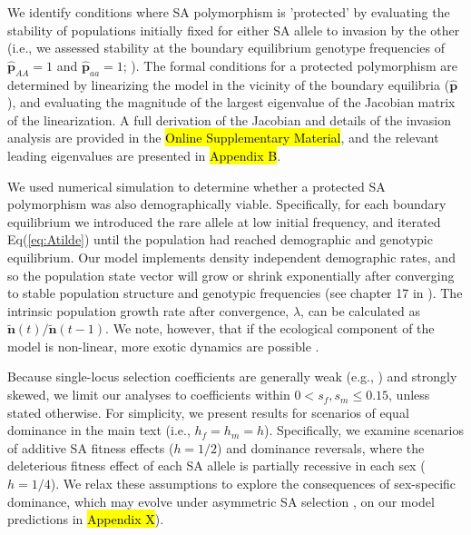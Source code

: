 \documentclass[11pt]{article}
\def\mbf#1{\mathbf{#1}}
\begin{document}
We identify conditions where SA polymorphism is 'protected' by evaluating the stability of populations initially fixed for either SA allele to invasion by the other (i.e., we assessed stability at the boundary equilibrium genotype frequencies of $\hat{\mbf{p}}_{AA} = 1$ and $\hat{\mbf{p}}_{aa} = 1$; \citealt{Levene1953, Prout1968, deVriesCaswell2019b}). The formal conditions for a protected polymorphism are determined by linearizing the model in the vicinity of the boundary equilibria ($\hat{\mbf{p}}$), and evaluating the magnitude of the largest eigenvalue of the Jacobian matrix of the linearization. A full derivation of the Jacobian and details of the invasion analysis are provided in the \hl{Online Supplementary Material}, and the relevant leading eigenvalues are presented in \hl{Appendix B}.


We used numerical simulation to determine whether a protected SA polymorphism was also demographically viable. Specifically, for each boundary equilibrium we introduced the rare allele at low initial frequency, and iterated Eq(\ref{eq:Atilde}) until the population had reached demographic and genotypic equilibrium. Our model implements density independent demographic rates, and so the population state vector will grow or shrink exponentially after converging to stable population structure and genotypic frequencies (see chapter 17 in \citealt{Caswell2001}). The intrinsic population growth rate after convergence, $\lambda$, can be calculated as $\tilde{\mbf{n}}(t)/\tilde{\mbf{n}}(t-1)$. We note, however, that if the ecological component of the model is non-linear, more exotic dynamics are possible \citep{de2020matrix}.

Because single-locus selection coefficients are generally weak (e.g., \citealt{Eyre-WalkerKeightly2007}) and strongly skewed, we limit our analyses to coefficients within $0 < s_f,s_m \leq 0.15$, unless stated otherwise. For simplicity, we present results for scenarios of equal dominance in the main text (i.e., $h_f = h_m = h$). Specifically, we examine scenarios of additive SA fitness effects ($h = 1/2$) and dominance reversals, where the deleterious fitness effect of each SA allele is partially recessive in each sex ($h = 1/4$). We relax these assumptions to explore the consequences of sex-specific dominance, which may evolve under asymmetric SA selection \citep{SpencerPriest2016}, on our model predictions in \hl{Appendix X}). 
\end{document}

